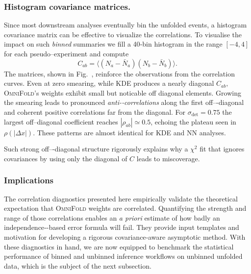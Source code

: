         \subsubsection{Histogram covariance matrices.}
            Since most downstream analyses eventually bin the unfolded events, a histogram covariance matrix can be effective to visualize the correlations.
            To visualise the impact on such \emph{binned} summaries we fill a 40‐bin histogram in the range $[-4,4]$ for each pseudo–experiment and compute
            \[
              C_{ab} = \bigl\langle
                         (N_a-\bar N_a)(N_b-\bar N_b)
                       \bigr\rangle.
            \]
            The matrices, shown in Fig.~, reinforce the observations from the correlation curves.
            Even at zero smearing, while KDE produces a nearly diagonal $C_{ab},$ \textsc{OmniFold}'s weights exhibit small but noticable off diagonal elements.
            Growing the smearing leads to pronounced \emph{anti-‐correlations} along the first off–-diagonal and coherent positive correlations far from the diagonal.
            For $\sigma_{\det}=0.75$ the largest off–diagonal coefficient reaches $|\rho_{ab}|\simeq0.5$, echoing the plateau seen in $\rho(|\Delta x|)$.  These patterns are almost identical for {KDE} and {NN} analyses.

            Such strong off–-diagonal structure rigorously explains why a $\chi^2$ fit that {ignores} covariances by using only the diagonal of $C$ leads to miscoverage.
        \subsubsection{Implications}
            The correlation diagnostics presented here {empirically validate} the theoretical expectation that \textsc{OmniFold} weights are correlated.
            Quantifying the strength and range of those correlations enables an \emph{a priori} estimate of how badly an independence‐-based error formula will fail.
            They provide {input templates} and motivation for developing a rigorous covariance‐aware asymptotic method.
            With these diagnostics in hand, we are now equipped to benchmark the statistical performance of binned and unbinned inference workflows on unbinned unfolded data, which is the subject of the next subsection.
